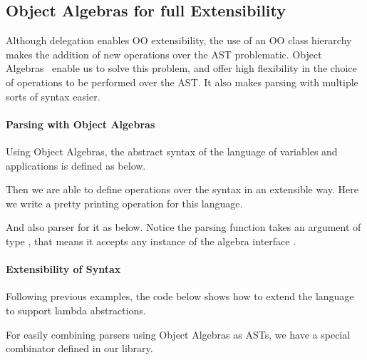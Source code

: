 \subsection{Object Algebras for full Extensibility}\label{subsec:overview-oa}

Although delegation enables OO extensibility, the use of an OO class
hierarchy makes the addition of new operations over the AST
problematic. Object Algebras~\cite{Oliveira2012} enable us to solve this problem, and
offer high flexibility in the choice of operations to be performed
over the AST. It also makes parsing with multiple sorts of syntax easier.

\paragraph{Parsing with Object Algebras} Using Object Algebras, the abstract syntax of the language of variables and applications is defined as below.


Then we are able to define operations over the syntax in an extensible way. Here we write a pretty printing operation for this language.


And also parser for it as below. Notice the parsing function  takes an argument of type , that means it accepts any instance of the algebra interface .


\paragraph{Extensibility of Syntax} Following previous examples, the code below shows how to extend the language to support lambda abstractions.


For easily combining parsers using Object Algebras as ASTs, we have a special combinator  defined in our library.

